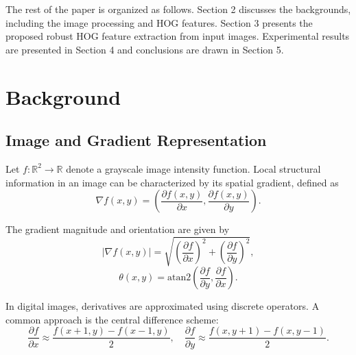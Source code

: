 \documentclass{elsarticle}
\begin{document}
The rest of the paper is organized as follows. Section 2
discusses the backgrounds, including the image processing and HOG features. Section 3 presents the proposed robust HOG feature extraction from input images. Experimental results are presented in Section 4 and conclusions are drawn in Section 5.
\section{Background}

\subsection{Image and Gradient Representation}

Let $ f : \mathbb{R}^2 \rightarrow \mathbb{R} $ denote a grayscale image intensity function. Local structural information in an image can be characterized by its spatial gradient, defined as
\begin{equation}
	\nabla f(x,y) = \left( \frac{\partial f(x,y)}{\partial x}, \frac{\partial f(x,y)}{\partial y} \right).
\end{equation}

The gradient magnitude and orientation are given by
\begin{equation}
	|\nabla f(x,y)| = \sqrt{ \left( \frac{\partial f}{\partial x} \right)^2 + \left( \frac{\partial f}{\partial y} \right)^2 },
\end{equation}
\begin{equation}
	\theta(x,y) = \mathrm{atan2} \left( \frac{\partial f}{\partial y}, \frac{\partial f}{\partial x} \right).
\end{equation}

In digital images, derivatives are approximated using discrete operators. A common approach is the central difference scheme:
\begin{equation}
	\frac{\partial f}{\partial x} \approx \frac{f(x+1,y) - f(x-1,y)}{2}, \quad
	\frac{\partial f}{\partial y} \approx \frac{f(x,y+1) - f(x,y-1)}{2}.
\end{equation}
\end{document}
